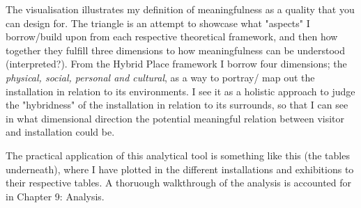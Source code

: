 The visualisation illustrates my definition of meaningfulness as a quality that you can design for. The triangle is an attempt to showcase what "aspects" I borrow/build upon from each respective theoretical framework, and then how together they fulfill three dimensions to how meaningfulness can be understood (interpreted?).
From the Hybrid Place framework I borrow four dimensions; the \emph{physical, social, personal and cultural}, as a way to portray/ map out the installation in relation to its environments. I see it as a holistic approach to judge the "hybridness" of the installation in relation to its surrounds, so that I can see in what dimensional direction the potential meaningful relation between visitor and installation could be.

The practical application of this analytical tool is something like this (the tables underneath), where I have plotted in the different installations and exhibitions to their respective tables. A thoruough walkthrough of the analysis is accounted for in Chapter 9: Analysis.
